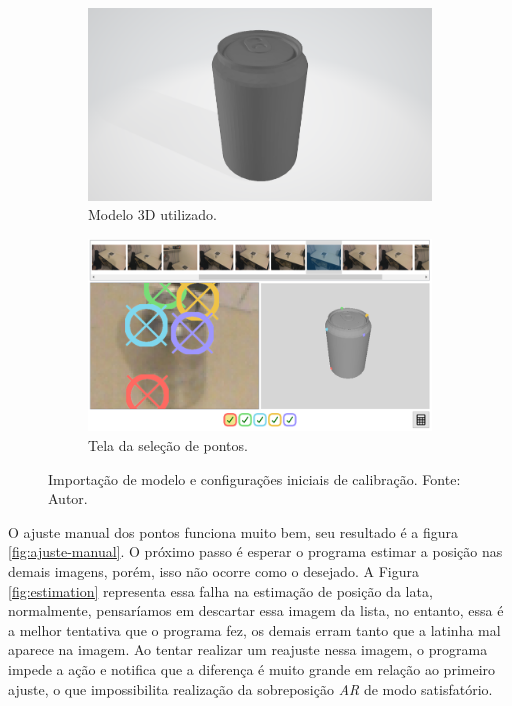 \begin{figure}[ht]
    \centering
        \begin{subfigure}{0.45\textwidth}
            \centering
            \includegraphics[width=.95\textwidth]{figuras/LatinhaSTL.png}
            \caption{Modelo 3D utilizado.}
            \label{fig:lata-da-net}
        \end{subfigure}
        \begin{subfigure}{0.45\textwidth}
            \centering
            \includegraphics[width=.95\linewidth]{figuras/TrainingPoints.png}
            \caption{Tela da seleção de pontos.}
            \label{fig:train-pt}
        \end{subfigure}
        \caption{Importação de modelo e configurações iniciais de calibração. Fonte: Autor.}
        \label{fig:calib-latinha}
\end{figure}

O ajuste manual dos pontos funciona muito bem, seu resultado é a figura \ref{fig:ajuste-manual}. O próximo passo é esperar o programa estimar a posição nas demais imagens, porém, isso não ocorre como o desejado. A Figura \ref{fig:estimation} representa essa falha na estimação de posição da lata, normalmente, pensaríamos em descartar essa imagem da lista, no entanto, essa é a melhor tentativa que o programa fez, os demais erram tanto que a latinha mal aparece na imagem. Ao tentar realizar um reajuste nessa imagem, o programa impede a ação e notifica que a diferença é muito grande em relação ao primeiro ajuste, o que impossibilita realização da sobreposição \textit{AR} de modo satisfatório.

